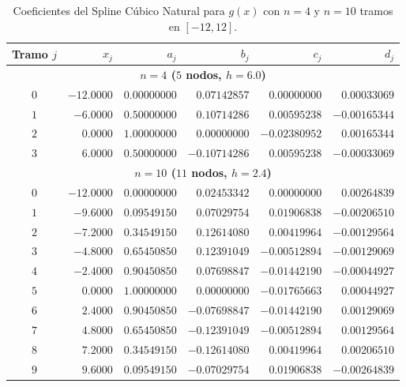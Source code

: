\documentclass[11pt,letterpaper]{article}
\begin{document}
\begin{table}[H]
    \centering
    \caption{Coeficientes del Spline Cúbico Natural para $g(x)$ con $n = 4$ y $n = 10$ tramos en $[-12, 12]$.}
    \label{tab:p3_gx}
    \small
    \begin{tabular}{c|rrrrr}
        \toprule
        Tramo $j$ & $x_j$ & $a_j$ & $b_j$ & $c_j$ & $d_j$ \\
        \midrule
        \multicolumn{6}{c}{\textbf{$n = 4$ ($5$ nodos, $h = 6.0$)}} \\
        \midrule
        $0$ & $-12.0000$ & $0.00000000$ & $0.07142857$  & $0.00000000$  & $0.00033069$ \\
        $1$ & $-6.0000$  & $0.50000000$ & $0.10714286$  & $0.00595238$  & $-0.00165344$ \\
        $2$ & $0.0000$   & $1.00000000$ & $0.00000000$  & $-0.02380952$ & $0.00165344$ \\
        $3$ & $6.0000$   & $0.50000000$ & $-0.10714286$ & $0.00595238$  & $-0.00033069$ \\
        \midrule
        \multicolumn{6}{c}{\textbf{$n = 10$ ($11$ nodos, $h = 2.4$)}} \\
        \midrule
        $0$ & $-12.0000$ & $0.00000000$ & $0.02453342$  & $0.00000000$  & $0.00264839$ \\
        $1$ & $-9.6000$  & $0.09549150$ & $0.07029754$  & $0.01906838$  & $-0.00206510$ \\
        $2$ & $-7.2000$  & $0.34549150$ & $0.12614080$  & $0.00419964$  & $-0.00129564$ \\
        $3$ & $-4.8000$  & $0.65450850$ & $0.12391049$  & $-0.00512894$ & $-0.00129069$ \\
        $4$ & $-2.4000$  & $0.90450850$ & $0.07698847$  & $-0.01442190$ & $-0.00044927$ \\
        $5$ & $0.0000$   & $1.00000000$ & $0.00000000$  & $-0.01765663$ & $0.00044927$ \\
        $6$ & $2.4000$   & $0.90450850$ & $-0.07698847$ & $-0.01442190$ & $0.00129069$ \\
        $7$ & $4.8000$   & $0.65450850$ & $-0.12391049$ & $-0.00512894$ & $0.00129564$ \\
        $8$ & $7.2000$   & $0.34549150$ & $-0.12614080$ & $0.00419964$  & $0.00206510$ \\
        $9$ & $9.6000$   & $0.09549150$ & $-0.07029754$ & $0.01906838$  & $-0.00264839$ \\
        \bottomrule
    \end{tabular}
\end{table}
\end{document}
